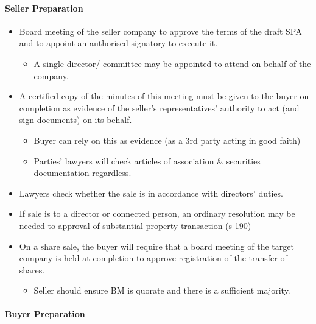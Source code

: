 \documentclass[
]{article}
\providecommand{\tightlist}{%
  \setlength{\itemsep}{0pt}\setlength{\parskip}{0pt}}
\begin{document}
\hypertarget{seller-preparation}{%
\paragraph{Seller Preparation}\label{seller-preparation}}

\begin{itemize}
\tightlist
\item
  Board meeting of the seller company to approve the terms of the draft
  SPA and to appoint an authorised signatory to execute it.

  \begin{itemize}
  \tightlist
  \item
    A single director/ committee may be appointed to attend on behalf of
    the company.
  \end{itemize}
\item
  A certified copy of the minutes of this meeting must be given to the
  buyer on completion as evidence of the seller's representatives'
  authority to act (and sign documents) on its behalf.

  \begin{itemize}
  \tightlist
  \item
    Buyer can rely on this as evidence (as a 3rd party acting in good
    faith)
  \item
    Parties' lawyers will check articles of association \& securities
    documentation regardless.
  \end{itemize}
\item
  Lawyers check whether the sale is in accordance with directors'
  duties.
\item
  If sale is to a director or connected person, an ordinary resolution
  may be needed to approval of substantial property transaction (s 190)
\item
  On a share sale, the buyer will require that a board meeting of the
  target company is held at completion to approve registration of the
  transfer of shares.

  \begin{itemize}
  \tightlist
  \item
    Seller should ensure BM is quorate and there is a sufficient
    majority.
  \end{itemize}
\end{itemize}

\hypertarget{buyer-preparation}{%
\paragraph{Buyer Preparation}\label{buyer-preparation}}
\end{document}
